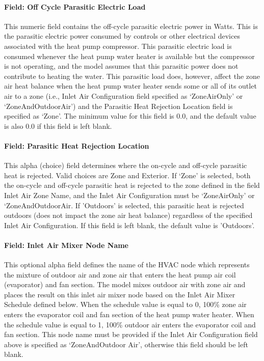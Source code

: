 \paragraph{Field: Off Cycle Parasitic Electric Load}\label{field-off-cycle-parasitic-electric-load-000}

This numeric field contains the off-cycle parasitic electric power in Watts. This is the parasitic electric power consumed by controls or other electrical devices associated with the heat pump compressor. This parasitic electric load is consumed whenever the heat pump water heater is available but the compressor is not operating, and the model assumes that this parasitic power does not contribute to heating the water. This parasitic load does, however, affect the zone air heat balance when the heat pump water heater sends some or all of its outlet air to a zone (i.e., Inlet Air Configuration field specified as `ZoneAirOnly' or `ZoneAndOutdoorAir') and the Parasitic Heat Rejection Location field is specified as `Zone'. The minimum value for this field is 0.0, and the default value is also 0.0 if this field is left blank.

\paragraph{Field: Parasitic Heat Rejection Location}\label{field-parasitic-heat-rejection-location}

This alpha (choice) field determines where the on-cycle and off-cycle parasitic heat is rejected. Valid choices are Zone and Exterior. If `Zone' is selected, both the on-cycle and off-cycle parasitic heat is rejected to the zone defined in the field Inlet Air Zone Name, and the Inlet Air Configuration must be `ZoneAirOnly' or `ZoneAndOutdoorAir. If 'Outdoors' is selected, this parasitic heat is rejected outdoors (does not impact the zone air heat balance) regardless of the specified Inlet Air Configuration. If this field is left blank, the default value is 'Outdoors'.

\paragraph{Field: Inlet Air Mixer Node Name}\label{field-inlet-air-mixer-node-name}

This optional alpha field defines the name of the HVAC node which represents the mixture of outdoor air and zone air that enters the heat pump air coil (evaporator) and fan section. The model mixes outdoor air with zone air and places the result on this inlet air mixer node based on the Inlet Air Mixer Schedule defined below. When the schedule value is equal to 0, 100\% zone air enters the evaporator coil and fan section of the heat pump water heater. When the schedule value is equal to 1, 100\% outdoor air enters the evaporator coil and fan section. This node name must be provided if the Inlet Air Configuration field above is specified as `ZoneAndOutdoor Air', otherwise this field should be left blank.

